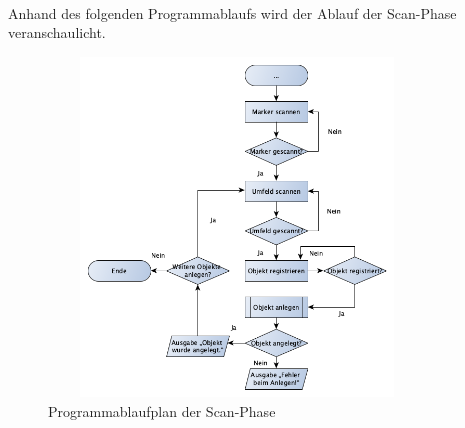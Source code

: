 \\ 
Anhand des folgenden Programmablaufs wird der Ablauf der Scan-Phase veranschaulicht.
\begin{figure}[hbt!]
    \centering
    \includegraphics[width=10cm,height=9cm,keepaspectratio]{4Umsetzung/Bilder/scanPAP.png}
    \caption{Programmablaufplan der Scan-Phase}
    \label{pic:startmenu}
\end{figure}